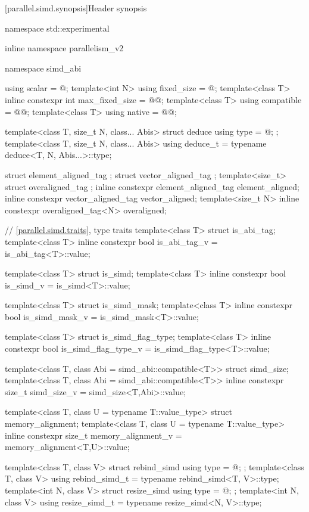 [parallel.simd.synopsis]{Header  synopsis}

\begin{codeblock}
namespace std::experimental {
inline namespace parallelism_v2 {
  namespace simd_abi {
    using scalar = @\seebelow@;
    template<int N> using fixed_size = @\seebelow@;
    template<class T> inline constexpr int max_fixed_size = @@;
    template<class T> using compatible = @@;
    template<class T> using native = @@;

    template<class T, size_t N, class... Abis> struct deduce { using type = @\seebelow@; };
    template<class T, size_t N, class... Abis> using deduce_t =
      typename deduce<T, N, Abis...>::type;
  }

  struct element_aligned_tag {};
  struct vector_aligned_tag {};
  template<size_t> struct overaligned_tag {};
  inline constexpr element_aligned_tag element_aligned{};
  inline constexpr vector_aligned_tag vector_aligned{};
  template<size_t N> inline constexpr overaligned_tag<N> overaligned{};

  // \ref{parallel.simd.traits},  type traits
  template<class T> struct is_abi_tag;
  template<class T> inline constexpr bool is_abi_tag_v = is_abi_tag<T>::value;

  template<class T> struct is_simd;
  template<class T> inline constexpr bool is_simd_v = is_simd<T>::value;

  template<class T> struct is_simd_mask;
  template<class T> inline constexpr bool is_simd_mask_v = is_simd_mask<T>::value;

  template<class T> struct is_simd_flag_type;
  template<class T> inline constexpr bool is_simd_flag_type_v =
    is_simd_flag_type<T>::value;

  template<class T, class Abi = simd_abi::compatible<T>> struct simd_size;
  template<class T, class Abi = simd_abi::compatible<T>>
    inline constexpr size_t simd_size_v = simd_size<T,Abi>::value;

  template<class T, class U = typename T::value_type> struct memory_alignment;
  template<class T, class U = typename T::value_type>
    inline constexpr size_t memory_alignment_v = memory_alignment<T,U>::value;

  template<class T, class V> struct rebind_simd { using type = @\seebelow@; };
  template<class T, class V> using rebind_simd_t = typename rebind_simd<T, V>::type;
  template<int N, class V> struct resize_simd { using type = @\seebelow@; };
  template<int N, class V> using resize_simd_t = typename resize_simd<N, V>::type;

}}
\end{codeblock}
